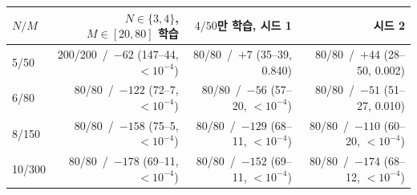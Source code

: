 \begin{tabular}{lrrr}
\toprule
$N/M$ & $N\in\{3,4\}$, $M\in[20,80]$ 학습 & $4/50$만 학습, 시드 1 & 시드 2 \\
\midrule
5/50 & 200/200 \,/\, $-62$ (147--44, $<10^{-4}$) & 80/80 \,/\, $+7$ (35--39, 0.840) & 80/80 \,/\, $+44$ (28--50, 0.002) \\
6/80 & 80/80 \,/\, $-122$ (72--7, $<10^{-4}$) & 80/80 \,/\, $-56$ (57--20, $<10^{-4}$) & 80/80 \,/\, $-51$ (51--27, 0.010) \\
8/150 & 80/80 \,/\, $-158$ (75--5, $<10^{-4}$) & 80/80 \,/\, $-129$ (68--11, $<10^{-4}$) & 80/80 \,/\, $-110$ (60--20, $<10^{-4}$) \\
10/300 & 80/80 \,/\, $-178$ (69--11, $<10^{-4}$) & 80/80 \,/\, $-152$ (69--11, $<10^{-4}$) & 80/80 \,/\, $-174$ (68--12, $<10^{-4}$) \\
\bottomrule
\end{tabular}%
